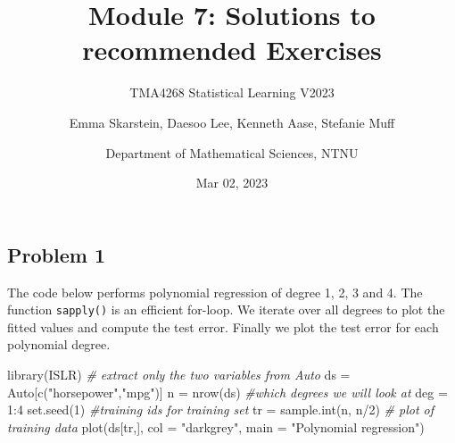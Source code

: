 \documentclass[
]{article}
\title{Module 7: Solutions to recommended Exercises}
\subtitle{TMA4268 Statistical Learning V2023}
\author{Emma Skarstein, Daesoo Lee, Kenneth Aase, Stefanie
Muff \and Department of Mathematical Sciences, NTNU}
\date{Mar 02, 2023}
\newenvironment{Shaded}{\begin{snugshade}}{\end{snugshade}}
\newcommand{\AttributeTok}[1]{\textcolor[rgb]{0.77,0.63,0.00}{#1}}
\newcommand{\CommentTok}[1]{\textcolor[rgb]{0.56,0.35,0.01}{\textit{#1}}}
\newcommand{\DecValTok}[1]{\textcolor[rgb]{0.00,0.00,0.81}{#1}}
\newcommand{\FunctionTok}[1]{\textcolor[rgb]{0.00,0.00,0.00}{#1}}
\newcommand{\NormalTok}[1]{#1}
\newcommand{\OtherTok}[1]{\textcolor[rgb]{0.56,0.35,0.01}{#1}}
\newcommand{\SpecialCharTok}[1]{\textcolor[rgb]{0.00,0.00,0.00}{#1}}
\newcommand{\StringTok}[1]{\textcolor[rgb]{0.31,0.60,0.02}{#1}}
\begin{document}
\maketitle

\hypertarget{problem-1}{%
\subsection{Problem 1}\label{problem-1}}

The code below performs polynomial regression of degree 1, 2, 3 and 4.
The function \texttt{sapply()} is an efficient for-loop. We iterate over
all degrees to plot the fitted values and compute the test error.
Finally we plot the test error for each polynomial degree.

\begin{Shaded}
\begin{Highlighting}[]
\FunctionTok{library}\NormalTok{(ISLR)}
\CommentTok{\# extract only the two variables from Auto}
\NormalTok{ds }\OtherTok{=}\NormalTok{ Auto[}\FunctionTok{c}\NormalTok{(}\StringTok{"horsepower"}\NormalTok{,}\StringTok{"mpg"}\NormalTok{)]}
\NormalTok{n }\OtherTok{=} \FunctionTok{nrow}\NormalTok{(ds)}
\CommentTok{\#which degrees we will look at}
\NormalTok{deg }\OtherTok{=} \DecValTok{1}\SpecialCharTok{:}\DecValTok{4}
\FunctionTok{set.seed}\NormalTok{(}\DecValTok{1}\NormalTok{)}
\CommentTok{\#training ids for training set}
\NormalTok{tr }\OtherTok{=} \FunctionTok{sample.int}\NormalTok{(n, n}\SpecialCharTok{/}\DecValTok{2}\NormalTok{)}
\CommentTok{\# plot of training data}
\FunctionTok{plot}\NormalTok{(ds[tr,], }\AttributeTok{col =} \StringTok{"darkgrey"}\NormalTok{, }\AttributeTok{main =} \StringTok{"Polynomial regression"}\NormalTok{)}


\end{Highlighting}
\end{Shaded}
\end{document}
